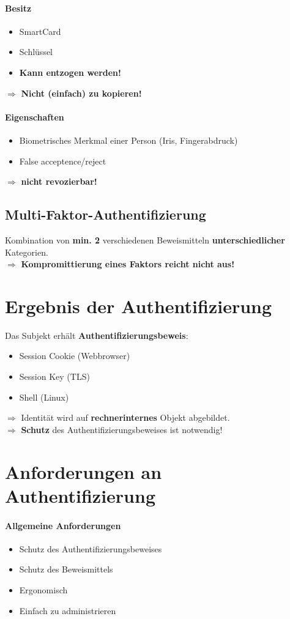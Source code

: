 \paragraph{Besitz}
\begin{itemize}
	\item SmartCard
	\item Schlüssel
	\item \textbf{Kann entzogen werden!}
\end{itemize}
$\Rightarrow$ \textbf{Nicht (einfach) zu kopieren!}

\paragraph{Eigenschaften}
\begin{itemize}
	\item Biometrisches Merkmal einer Person (Iris, Fingerabdruck)
	\item False acceptence/reject
\end{itemize}
$\Rightarrow$ \textbf{nicht revozierbar!}

\subsection{Multi-Faktor-Authentifizierung}
Kombination von \textbf{min. 2} verschiedenen Beweismitteln \textbf{unterschiedlicher} Kategorien.\\
$\Rightarrow$ \textbf{Kompromittierung eines Faktors reicht nicht aus!}

\section{Ergebnis der Authentifizierung}
Das Subjekt erhält \textbf{Authentifizierungsbeweis}:
\begin{itemize}
	\item Session Cookie (Webbrowser)
	\item Session Key (TLS)
	\item Shell (Linux)
\end{itemize}
$\Rightarrow$ Identität wird auf \textbf{rechnerinternes} Objekt abgebildet.\\
$\Rightarrow$ \textbf{Schutz} des Authentifizierungsbeweises ist notwendig!

\section{Anforderungen an Authentifizierung}
\paragraph{Allgemeine Anforderungen}
\begin{itemize}
	\item Schutz des Authentifizierungsbeweises
	\item Schutz des Beweismittels
	\item Ergonomisch
	\item Einfach zu administrieren
\end{itemize}

